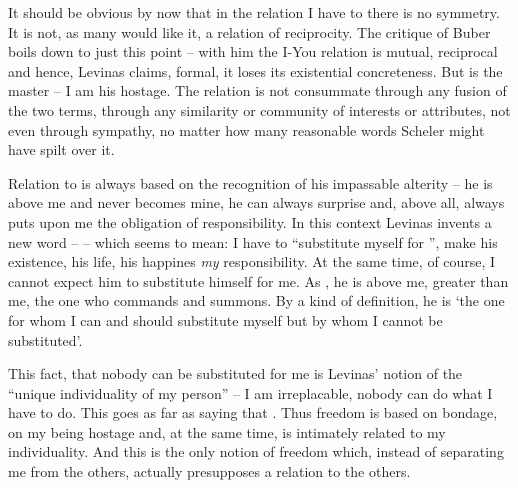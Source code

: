 It should be obvious by now that in the relation I have to  there is no symmetry. It is
not, as many would like it, a relation of reciprocity. 
The critique of Buber boils down to just this point -- with him the I-You relation is mutual, 
reciprocal and hence, Levinas claims, formal, it loses its existential concreteness.
But  is
the master -- I am his hostage. The relation is not consummate through any fusion of the
two terms, through any similarity or community of interests or attributes, not even through
sympathy, no matter how many reasonable words Scheler might have spilt over it.

Relation to  is always based on the recognition of his impassable alterity -- he 
is above me and never
becomes mine, he can always surprise and, above all, always puts upon me the obligation of
responsibility. In this context Levinas invents a new word --  -- which seems
to mean: I have to ``substitute myself for '', make his existence, his 
life, his happines {\em my} responsibility. 
At the same time, of course, I cannot expect him to substitute himself for me. As ,
he is above me, greater than me, the one who commands and summons. 
By a kind of definition, he is `the one for whom I can and should
substitute myself but by whom I cannot be substituted'. 

This fact, that nobody can be substituted 
for me is Levinas' notion of the ``unique individuality of my person'' -- I am 
irreplacable,
nobody can do what I have to do. This goes as far as saying that . Thus freedom is based on bondage, on my being
hostage and, at the same time, is intimately related to my individuality. And this is the only
notion of freedom which, instead of separating me from the others, actually presupposes
a relation to the others.

